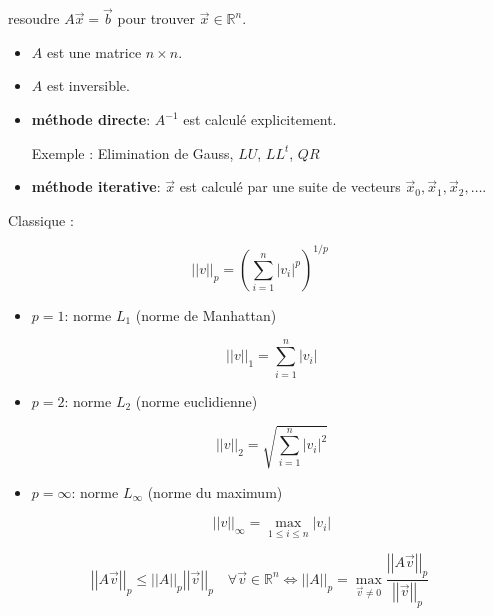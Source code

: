 
\hformbar{}


resoudre $A\vec{x} = \vec{b}$ pour trouver $\vec{x} \in \mathbb{R}^n$.


\begin{itemize}
    \item $A$ est une matrice $n \times n$.
    \item $A$ est inversible.
\end{itemize}


\begin{itemize}
\item \textbf{méthode directe}: $A^{-1}$ est calculé explicitement.

Exemple : Elimination de Gauss, $LU$, $LL^t$, $QR$

\item \textbf{méthode iterative}: $\vec{x}$ est calculé par une suite de vecteurs $\vec{x}_0, \vec{x}_1, \vec{x}_2, \dots$.
\end{itemize}



Classique : 

$$\left||v|\right|_p = \left(\sum_{i=1}^n \left|v_i\right|^p\right)^{1/p}$$

\begin{itemize}
    \item $p=1$: norme $L_1$ (norme de Manhattan)
    
    $$\left||v|\right|_1 = \sum_{i=1}^n \left|v_i\right|$$
    \item $p=2$: norme $L_2$ (norme euclidienne)
    
    $$\left||v|\right|_2 = \sqrt{\sum_{i=1}^n \left|v_i\right|^2}$$
    \item $p=\infty$: norme $L_\infty$ (norme du maximum)
    
    $$\left||v|\right|_\infty = \max_{1 \leq i \leq n} \left|v_i\right|$$
\end{itemize}


$$\left||A\vec{v}|\right|_p \leq \left||A|\right|_p \left||\vec{v}|\right|_p \quad \forall \vec{v} \in \mathbb{R}^n \Longleftrightarrow \left||A|\right|_p = \max_{\vec{v} \neq 0} \frac{\left||A\vec{v}|\right|_p}{\left||\vec{v}|\right|_p}$$

